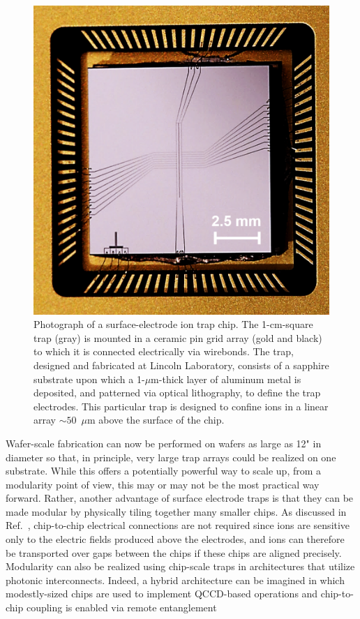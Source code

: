 \documentclass[%
12pt,
 amsmath,amssymb,
]{revtex4-2}
\begin{document}
\begin{figure}[tp]
    \centering
    \includegraphics[width=0.8\columnwidth]{Al_trap_v4.png}
    \caption{Photograph of a surface-electrode ion trap chip.  The 1-cm-square trap (gray) is mounted in a ceramic pin grid array (gold and black) to which it is connected electrically via wirebonds.  The trap, designed and fabricated at Lincoln Laboratory, consists of a sapphire substrate upon which a 1-$\mu$m-thick layer of aluminum metal is deposited, and patterned via optical lithography, to define the trap electrodes.  This particular trap is designed to confine ions in a linear array ${\sim}50$~$\mu$m above the surface of the chip.}
    \label{fig:chiptrap}
\end{figure}

Wafer-scale fabrication can now be performed on wafers as large as 12" in diameter so that, in principle, very large trap arrays could be realized on one substrate.  While this offers a potentially powerful way to scale up, from a modularity point of view, this may or may not be the most practical way forward.  Rather, another advantage of surface electrode traps is that they can be made modular by physically tiling together many smaller chips.  As discussed in Ref.~\cite{LekitscheMicrowaveBlueprint2017}, chip-to-chip electrical connections are not required since ions are sensitive only to the electric fields produced above the electrodes, and ions can therefore be transported over gaps between the chips if these chips are aligned precisely.  Modularity can also be realized using chip-scale traps in architectures that utilize photonic interconnects.  Indeed, a hybrid architecture can be imagined in which modestly-sized chips are used to implement QCCD-based operations and chip-to-chip coupling is enabled via remote entanglement \cite{MonroeKimScaling2013}
\end{document}
